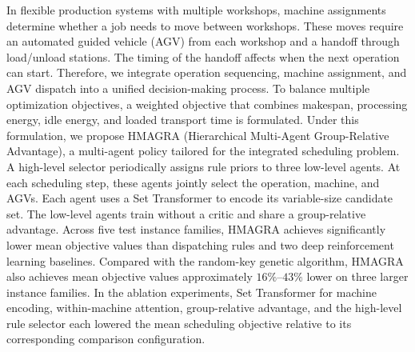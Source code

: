 In flexible production systems with multiple workshops, machine assignments
determine whether a job needs to move between workshops. These moves require
an automated guided vehicle (AGV) from each workshop and a handoff through
load/unload stations. The timing of the handoff affects when the next
operation can start. Therefore, we integrate operation sequencing, machine assignment,
and AGV dispatch into a unified decision-making process. To balance multiple optimization objectives,
a weighted objective that combines makespan, processing energy, idle energy, and loaded transport time is formulated.
Under this formulation, we propose HMAGRA (Hierarchical Multi-Agent Group-Relative Advantage),
a multi-agent policy tailored for the integrated scheduling problem. A high-level selector
periodically assigns rule priors to three low-level agents. At each scheduling
step, these agents jointly select the operation, machine, and AGVs. Each agent
uses a Set Transformer to encode its variable-size candidate set. The
low-level agents train without a critic and share a group-relative advantage.
Across five test instance families, HMAGRA achieves significantly lower mean objective
values than dispatching rules and two deep reinforcement learning baselines. Compared with the random-key genetic
algorithm, HMAGRA also achieves mean objective values approximately $16\%$--$43\%$
lower on three larger instance families. In the ablation experiments, Set Transformer for machine encoding,
within-machine attention, group-relative advantage, and the high-level rule selector each lowered the
mean scheduling objective relative to its corresponding comparison configuration.